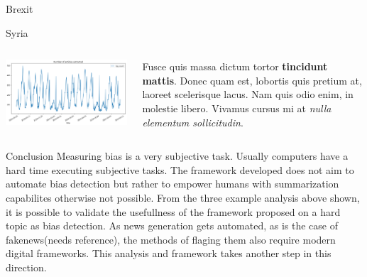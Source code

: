 \documentclass[final,8pt]{beamer} %
\newlength{\twocolwid}
\begin{document}
\begin{frame}[t]
\begin{columns}[t]
\begin{column}{\twocolwid}
\begin{block}{Brexit}
\end{block}


\begin{block}{Syria}
    \begin{columns}
        \begin{column}{.45\textwidth}
            \includegraphics[width=0.8\linewidth]{log_extraction.png} 
        \end{column}
        \begin{column}{.55\textwidth}
            Fusce quis massa dictum tortor \textbf{tincidunt mattis}. Donec quam est, lobortis quis pretium at, laoreet scelerisque lacus. Nam quis odio enim, in molestie libero. Vivamus cursus mi at \textit{nulla elementum sollicitudin}.
        \end{column}
    \end{columns}
\end{block}


\begin{block}{Conclusion {}}
    Measuring bias is a very subjective task. 
    Usually computers have a hard time executing subjective tasks. 
    The framework developed does not aim to automate bias detection but 
    rather to empower humans with summarization capabilites otherwise not possible.
    From the three example analysis above shown, it is possible to validate the usefullness of the framework proposed on a hard topic as bias detection.
    As news generation gets automated, as is the case of fakenews(needs reference), the methods of flaging them also require modern digital frameworks.
    This analysis and framework takes another step in this direction.


\end{block}
\end{column}
\end{columns}
\end{frame}
\end{document}
